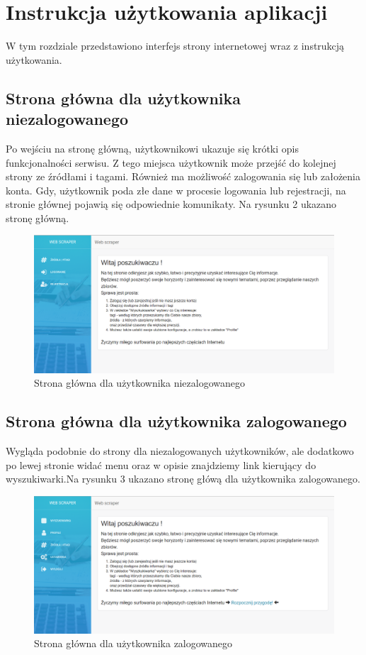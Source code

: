 \documentclass[12pt, titlepage]{article}
\begin{document}
	\newpage
	\section{Instrukcja użytkowania aplikacji}
	W tym rozdziale przedstawiono interfejs strony internetowej wraz z instrukcją użytkowania.
	\subsection{Strona główna dla użytkownika niezalogowanego}
	Po wejściu na stronę główną, użytkownikowi ukazuje się krótki opis funkcjonalności serwisu. Z tego miejsca użytkownik może przejść do kolejnej strony ze źródłami i tagami. Również ma możliwość zalogowania się lub założenia konta. Gdy, użytkownik poda złe dane w procesie logowania lub rejestracji, na stronie głównej pojawią się odpowiednie komunikaty. Na rysunku 2 ukazano stronę główną.
	\begin{figure}[H]
		\centering
		\includegraphics[scale=0.40]{obrazki/stronaGlowna_niezalogowany.png}
		\caption{Strona główna dla użytkownika niezalogowanego}
		\label{fig:db_schema}
	\end{figure}

	\newpage
	\subsection{Strona główna dla użytkownika zalogowanego}
	Wygląda podobnie do strony dla niezalogowanych użytkowników, ale dodatkowo po lewej stronie widać menu oraz w opisie znajdziemy link kierujący do wyszukiwarki.Na rysunku 3 ukazano stronę główą dla użytkownika zalogowanego.
	\begin{figure}[H]
		\centering
		\includegraphics[scale=0.40]{obrazki/stronaGlowna_zalogowany.png}
		\caption{Strona główna dla użytkownika zalogowanego}
		\label{fig:db_schema}
	\end{figure}
\end{document}

